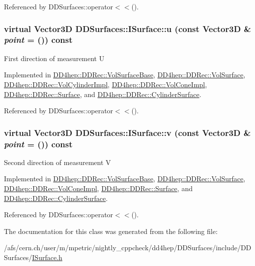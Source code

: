 Referenced by DDSurfaces::operator$<$$<$().\hypertarget{class_d_d_surfaces_1_1_i_surface_a09fd4aa43cc96d50b4b81b94107f7d8f}{
\subsubsection[{u}]{\setlength{\rightskip}{0pt plus 5cm}virtual {\bf Vector3D} DDSurfaces::ISurface::u (const {\bf Vector3D} \& {\em point} = {()}) const}}
\label{class_d_d_surfaces_1_1_i_surface_a09fd4aa43cc96d50b4b81b94107f7d8f}
First direction of measurement U 

Implemented in \hyperlink{class_d_d4hep_1_1_d_d_rec_1_1_vol_surface_base_a6b72381e54cf0c94ab56db4bdbc8b4a4}{DD4hep::DDRec::VolSurfaceBase}, \hyperlink{class_d_d4hep_1_1_d_d_rec_1_1_vol_surface_a6a23fdeba39bcffea350b53dcac8b3d0}{DD4hep::DDRec::VolSurface}, \hyperlink{class_d_d4hep_1_1_d_d_rec_1_1_vol_cylinder_impl_a7c2990e721f48f65bd4fda4cfd00c976}{DD4hep::DDRec::VolCylinderImpl}, \hyperlink{class_d_d4hep_1_1_d_d_rec_1_1_vol_cone_impl_ae3f99967ddeb67c1ad76414cea068395}{DD4hep::DDRec::VolConeImpl}, \hyperlink{class_d_d4hep_1_1_d_d_rec_1_1_surface_af08e3ae0be217b8bc54d9a447a66be03}{DD4hep::DDRec::Surface}, and \hyperlink{class_d_d4hep_1_1_d_d_rec_1_1_cylinder_surface_adb01b4c563ea150f1c2a4d595beca0e6}{DD4hep::DDRec::CylinderSurface}.

Referenced by DDSurfaces::operator$<$$<$().\hypertarget{class_d_d_surfaces_1_1_i_surface_a61c9f2057ea0383b39ead13a147b2838}{
\subsubsection[{v}]{\setlength{\rightskip}{0pt plus 5cm}virtual {\bf Vector3D} DDSurfaces::ISurface::v (const {\bf Vector3D} \& {\em point} = {()}) const}}
\label{class_d_d_surfaces_1_1_i_surface_a61c9f2057ea0383b39ead13a147b2838}
Second direction of measurement V 

Implemented in \hyperlink{class_d_d4hep_1_1_d_d_rec_1_1_vol_surface_base_a0dd53eec9381d83d0632329223d0b24b}{DD4hep::DDRec::VolSurfaceBase}, \hyperlink{class_d_d4hep_1_1_d_d_rec_1_1_vol_surface_a46cb5a2e9e28ec469657b7331a83b0ed}{DD4hep::DDRec::VolSurface}, \hyperlink{class_d_d4hep_1_1_d_d_rec_1_1_vol_cone_impl_a305c9b455b4e958dbb511f9136ecaf8b}{DD4hep::DDRec::VolConeImpl}, \hyperlink{class_d_d4hep_1_1_d_d_rec_1_1_surface_a76edfb105ebae153080713c99a310044}{DD4hep::DDRec::Surface}, and \hyperlink{class_d_d4hep_1_1_d_d_rec_1_1_cylinder_surface_a8cf924dc19c5eb87e435dd1918e14407}{DD4hep::DDRec::CylinderSurface}.

Referenced by DDSurfaces::operator$<$$<$().

The documentation for this class was generated from the following file:\begin{DoxyCompactItemize}
\item 
/afs/cern.ch/user/m/mpetric/nightly\_\-cppcheck/dd4hep/DDSurfaces/include/DDSurfaces/\hyperlink{_i_surface_8h}{ISurface.h}\end{DoxyCompactItemize}
